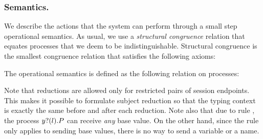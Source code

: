 \subsubsection{Semantics.}
We describe the actions that the system can perform through a small step operational semantics.
As usual, we use  a \emph{structural congruence} relation that equates processes that we deem to be indistinguishable. Structural congruence is the smallest congruence relation that satisfies the following axioms:

The operational semantics is defined as the following relation on processes:

Note that reductions are allowed only for restricted pairs of session endpoints. This makes it possible to formulate subject reduction so that the typing context is exactly the same before and after each reduction.
%
Note also that due to rule , the process \( y ? (l) . P \) can receive \emph{any} base value.
On the other hand, since the rule  only applies to sending base values, there is no way to send a variable or a name.

